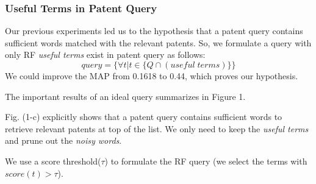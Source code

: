 \documentclass{sig-alternate}
\begin{document}
\subsubsection{Useful Terms in Patent Query}
Our previous experiments led us to the hypothesis that a patent query contains sufficient words matched with the relevant patents.
So, we formulate a query with only RF {\em useful terms} exist in patent query as follows: 
\begin{equation}
 query = \{\forall t|t \in \{ Q\cap (useful \; terms)\}\}   
 \label{eq:score}
\end{equation}
We could improve the MAP from 0.1618 to 0.44, which proves our hypothesis.

The important results of an ideal query summarizes in Figure 1. 

Fig. (1-c) explicitly shows that a patent query contains sufficient words to retrieve relevant patents at top of the list. We only need to keep the {\em useful terms} and prune out the {\em noisy words}.

We use a score threshold($\tau$) to formulate the RF query (we select the terms with $ score(t)>\tau $). 
\end{document}
